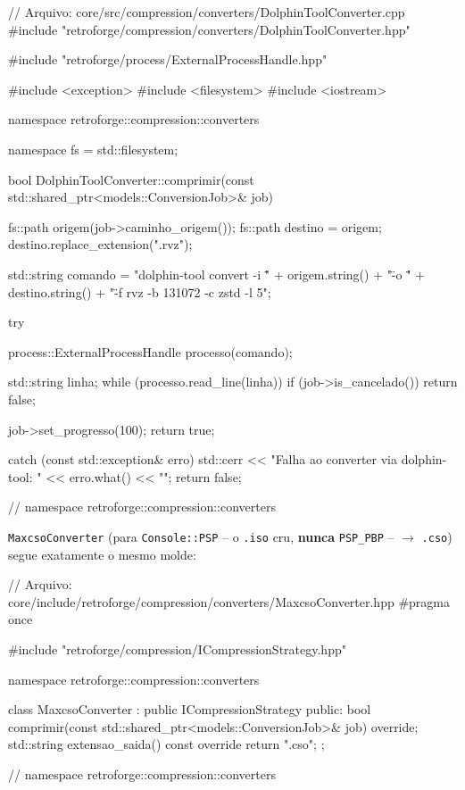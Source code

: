 \begin{CaixaCodigo}
// Arquivo: core/src/compression/converters/DolphinToolConverter.cpp
#include "retroforge/compression/converters/DolphinToolConverter.hpp"

#include "retroforge/process/ExternalProcessHandle.hpp"

#include <exception>
#include <filesystem>
#include <iostream>

namespace retroforge::compression::converters {

namespace fs = std::filesystem;

bool DolphinToolConverter::comprimir(const std::shared_ptr<models::ConversionJob>& job) {
    fs::path origem(job->caminho_origem());
    fs::path destino = origem;
    destino.replace_extension(".rvz");

    std::string comando = "dolphin-tool convert -i \"" + origem.string() + "\" -o \"" +
                          destino.string() + "\" -f rvz -b 131072 -c zstd -l 5";

    try {
        process::ExternalProcessHandle processo(comando);

        std::string linha;
        while (processo.read_line(linha)) {
            if (job->is_cancelado()) {
                return false;
            }
        }

        job->set_progresso(100);
        return true;

    } catch (const std::exception& erro) {
        std::cerr << "Falha ao converter via dolphin-tool: " << erro.what() << "\n";
        return false;
    }
}

} // namespace retroforge::compression::converters
\end{CaixaCodigo}

\texttt{MaxcsoConverter} (para \texttt{Console::PSP} -- o \texttt{.iso} cru, \textbf{nunca} \texttt{PSP\_PBP} -- $\rightarrow$ \texttt{.cso}) segue exatamente o mesmo molde:

\begin{CaixaCodigo}
// Arquivo: core/include/retroforge/compression/converters/MaxcsoConverter.hpp
#pragma once

#include "retroforge/compression/ICompressionStrategy.hpp"

namespace retroforge::compression::converters {

class MaxcsoConverter : public ICompressionStrategy {
public:
    bool comprimir(const std::shared_ptr<models::ConversionJob>& job) override;
    std::string extensao_saida() const override { return ".cso"; }
};

} // namespace retroforge::compression::converters
\end{CaixaCodigo}

